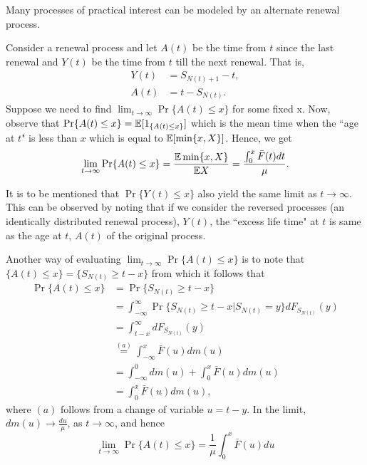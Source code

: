 \documentclass[a4paper,10pt,english]{article}
\begin{document}
Many processes of practical interest can be modeled by an alternate renewal process. 
\begin{exmp} Consider a renewal process and let $A(t)$ be the time from $t$ since the last renewal and $Y(t)$ be the time from $t$ till the next renewal. That is,
\begin{align*}
Y(t) &=S_{N(t)+1}-t,\\
A(t) &=t-S_{N(t)}.
\end{align*}   
Suppose we need to find $\lim_{t \to \infty}\Pr\{A(t) \leq x\}$ for some fixed  x. Now, observe that $\Pr\{A(t) \leq x\}=\mathbb{E}[1_{\{A(t) \leq x\}}]$ which is the mean time when the ``age at $t$" is less than $x$ which is equal to $\mathbb{E}[\min\{x,X\}]$. Hence, we get\\
\begin{equation*}
\lim_{t \rightarrow \infty} \Pr\{A(t) \leq x\} =\frac{\mathbb{E} \min\{x,X\}}{\mathbb{E} X} = \frac{\int_{0}^{x}\bar{F}(t)dt}{\mu}.
\end{equation*}  
\end{exmp}
It is to be mentioned that $\Pr\{Y(t)\leq x\}$ also yield the same limit as $t \to \infty$. This can be observed by noting that if we consider the reversed processes (an identically distributed renewal process), $Y(t)$,  the ``excess life time" at $t$ is same as the age at $t$, $A(t)$ of the original process.

Another way of evaluating $\lim_{t\to \infty} \Pr\{A(t)\leq x\}$ is to note that $\{A(t)\leq x\} = \{S_{N(t)}\geq t-x\}$ from which it follows that
\begin{align*}
\Pr\{A(t)\leq x\} &= \Pr\{S_{N(t)}\geq t-x\} \\
& = \int_{-\infty}^{\infty} \Pr\{S_{N(t)} \geq t-x | S_{N(t)}=y\}dF_{S_{N(t)}}(y) \\
& = \int_{t-x}^\infty dF_{S_{N(t)}}(y)\\
&\stackrel{(a)}{=} \int_{-\infty}^x \bar F(u)dm(u)\\
&= \int_{-\infty}^0 dm(u) + \int_{0}^x \bar{F}(u)dm(u)\\
& = \int_{0}^x \bar{F}(u)dm(u),
\end{align*}
where $(a)$ follows from a change of variable $u = t-y$. In the limit, $dm(u) \to \frac{du}{\mu}$, as $t \to \infty$, and hence 
\begin{equation}
\lim_{t\to \infty} \Pr\{A(t)\leq x\} = \frac{1}{\mu}\int_{0}^x \bar{F}(u)du
\end{equation}

\end{document}
